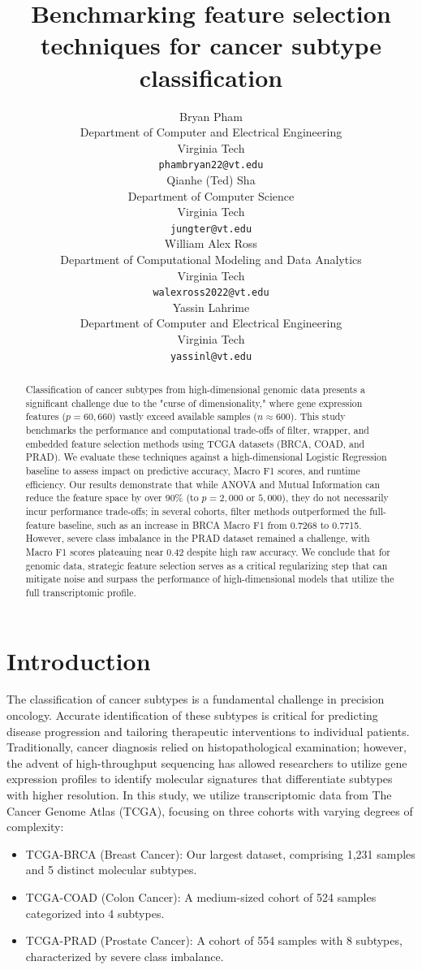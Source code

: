 \documentclass{article}
\title{Benchmarking feature selection techniques for cancer subtype classification}
\author{%
  Bryan Pham \\
  Department of Computer and Electrical Engineering \\
  Virginia Tech \\
  \texttt{phambryan22@vt.edu} \\
  \And
  Qianhe (Ted) Sha \\
  Department of Computer Science \\
  Virginia Tech \\
  \texttt{jungter@vt.edu} \\
  \And
  William Alex Ross \\
  Department of Computational Modeling and Data Analytics \\
  Virginia Tech \\
  \texttt{walexross2022@vt.edu} \\
  \And
  Yassin Lahrime \\
  Department of Computer and Electrical Engineering \\
  Virginia Tech \\
  \texttt{yassinl@vt.edu} \\
}
\begin{document}
\maketitle
\begin{abstract}
Classification of cancer subtypes from high-dimensional genomic data presents a significant challenge due to the "curse of dimensionality," where gene expression features ($p=60{,}660$) vastly exceed available samples ($n \approx 600$). This study benchmarks the performance and computational trade-offs of filter, wrapper, and embedded feature selection methods using TCGA datasets (BRCA, COAD, and PRAD). We evaluate these techniques against a high-dimensional Logistic Regression baseline to assess impact on predictive accuracy, Macro F1 scores, and runtime efficiency. Our results demonstrate that while ANOVA and Mutual Information can reduce the feature space by over 90\% (to $p=2{,}000$ or $5{,}000$), they do not necessarily incur performance trade-offs; in several cohorts, filter methods outperformed the full-feature baseline, such as an increase in BRCA Macro F1 from 0.7268 to 0.7715. However, severe class imbalance in the PRAD dataset remained a challenge, with Macro F1 scores plateauing near 0.42 despite high raw accuracy. We conclude that for genomic data, strategic feature selection serves as a critical regularizing step that can mitigate noise and surpass the performance of high-dimensional models that utilize the full transcriptomic profile.
\end{abstract}















\section{Introduction}

The classification of cancer subtypes is a fundamental challenge in precision oncology. Accurate identification of these subtypes is critical for predicting disease progression and tailoring therapeutic interventions to individual patients. Traditionally, cancer diagnosis relied on histopathological examination; however, the advent of high-throughput sequencing has allowed researchers to utilize gene expression profiles to identify molecular signatures that differentiate subtypes with higher resolution. In this study, we utilize transcriptomic data from The Cancer Genome Atlas (TCGA), focusing on three cohorts with varying degrees of complexity:
\begin{itemize}
    \item TCGA-BRCA (Breast Cancer): Our largest dataset, comprising 1,231 samples and 5 distinct molecular subtypes.
    \item TCGA-COAD (Colon Cancer): A medium-sized cohort of 524 samples categorized into 4 subtypes.
    \item TCGA-PRAD (Prostate Cancer): A cohort of 554 samples with 8 subtypes, characterized by severe class imbalance.
\end{itemize}
\end{document}
